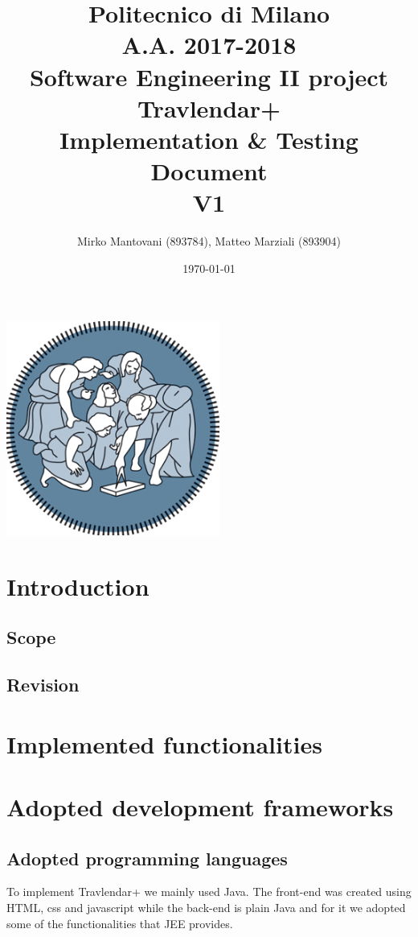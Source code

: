 \documentclass{article}
\author{Mirko Mantovani (893784), Matteo Marziali (893904)}
\date{\today}
\title{Politecnico di Milano
	\\A.A. 2017\@-\@2018
	\\Software Engineering II project \\ \textbf{Travlendar+}
	\\
	\textbf{I}mplementation \& \textbf{T}esting 
	\\ \textbf{D}ocument 
	\\
	\textbf{V1}}
\begin{document}
\maketitle
\begin{center}
	\includegraphics[width=7cm]{polimi-logo}
\end{center}
\clearpage
{\hypersetup{hidelinks}\tableofcontents}

\clearpage

\section{Introduction}
\subsection{Scope}

\subsection{Revision}


\clearpage
\section{Implemented functionalities}


\clearpage
\section{Adopted development frameworks}
\subsection{Adopted programming languages}

To implement Travlendar+ we mainly used Java. The front-end was created using HTML, css and javascript while the back-end is plain Java and for it we adopted some of the functionalities that JEE provides.
\end{document}
